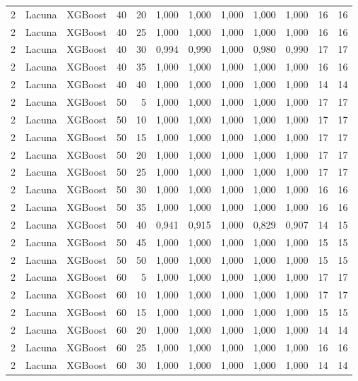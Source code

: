 \begin{longtable}{@{}rllrrrrrrrrr@{}}
2 & Lacuna & XGBoost & 40 & 20 & 1,000 & 1,000 & 1,000 & 1,000 & 1,000 & 16 & 16 \\
2 & Lacuna & XGBoost & 40 & 25 & 1,000 & 1,000 & 1,000 & 1,000 & 1,000 & 16 & 16 \\
2 & Lacuna & XGBoost & 40 & 30 & 0,994 & 0,990 & 1,000 & 0,980 & 0,990 & 17 & 17 \\
2 & Lacuna & XGBoost & 40 & 35 & 1,000 & 1,000 & 1,000 & 1,000 & 1,000 & 16 & 16 \\
2 & Lacuna & XGBoost & 40 & 40 & 1,000 & 1,000 & 1,000 & 1,000 & 1,000 & 14 & 14 \\
2 & Lacuna & XGBoost & 50 & 5 & 1,000 & 1,000 & 1,000 & 1,000 & 1,000 & 17 & 17 \\
2 & Lacuna & XGBoost & 50 & 10 & 1,000 & 1,000 & 1,000 & 1,000 & 1,000 & 17 & 17 \\
2 & Lacuna & XGBoost & 50 & 15 & 1,000 & 1,000 & 1,000 & 1,000 & 1,000 & 17 & 17 \\
2 & Lacuna & XGBoost & 50 & 20 & 1,000 & 1,000 & 1,000 & 1,000 & 1,000 & 17 & 17 \\
2 & Lacuna & XGBoost & 50 & 25 & 1,000 & 1,000 & 1,000 & 1,000 & 1,000 & 17 & 17 \\
2 & Lacuna & XGBoost & 50 & 30 & 1,000 & 1,000 & 1,000 & 1,000 & 1,000 & 16 & 16 \\
2 & Lacuna & XGBoost & 50 & 35 & 1,000 & 1,000 & 1,000 & 1,000 & 1,000 & 16 & 16 \\
2 & Lacuna & XGBoost & 50 & 40 & 0,941 & 0,915 & 1,000 & 0,829 & 0,907 & 14 & 15 \\
2 & Lacuna & XGBoost & 50 & 45 & 1,000 & 1,000 & 1,000 & 1,000 & 1,000 & 15 & 15 \\
2 & Lacuna & XGBoost & 50 & 50 & 1,000 & 1,000 & 1,000 & 1,000 & 1,000 & 15 & 15 \\
2 & Lacuna & XGBoost & 60 & 5 & 1,000 & 1,000 & 1,000 & 1,000 & 1,000 & 17 & 17 \\
2 & Lacuna & XGBoost & 60 & 10 & 1,000 & 1,000 & 1,000 & 1,000 & 1,000 & 17 & 17 \\
2 & Lacuna & XGBoost & 60 & 15 & 1,000 & 1,000 & 1,000 & 1,000 & 1,000 & 15 & 15 \\
2 & Lacuna & XGBoost & 60 & 20 & 1,000 & 1,000 & 1,000 & 1,000 & 1,000 & 14 & 14 \\
2 & Lacuna & XGBoost & 60 & 25 & 1,000 & 1,000 & 1,000 & 1,000 & 1,000 & 16 & 16 \\
2 & Lacuna & XGBoost & 60 & 30 & 1,000 & 1,000 & 1,000 & 1,000 & 1,000 & 14 & 14 \\

\end{longtable}
